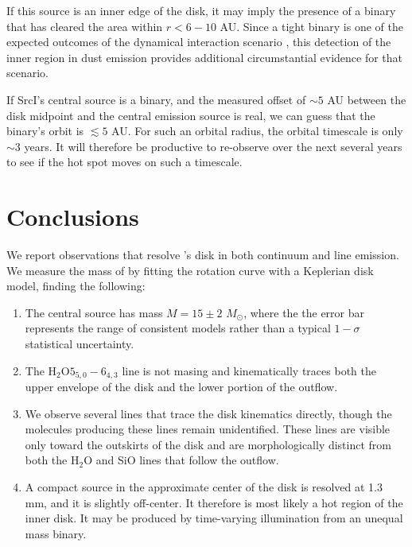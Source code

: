 \documentclass[twocolumn]{aastex61}
\newcommand{\msun}{\ensuremath{M_{\odot}}\xspace}			%
\newcommand{\water}{H$_{2}$O\xspace}		%
\begin{document}
If this source is an inner edge of the disk, it may imply the presence of a
binary that has cleared the area within $r<6-10$ AU.  Since a tight binary is
one of the expected outcomes of the dynamical interaction scenario
\citep{Goddi2011b}, this
detection of the inner region in dust emission provides additional
circumstantial evidence for that scenario.

If SrcI's central source is a binary, and the measured offset of $\sim5$ AU
between the disk midpoint and the central emission source is real, we can guess
that the binary's orbit is $\lesssim5$ AU.  For such an orbital radius, the
orbital timescale is only $\sim3$ years.   It will therefore be productive to
re-observe \sourcei over the next several years to see if the hot spot moves on
such a timescale.

\section{Conclusions}
\label{sec:conclusions}
We report observations that resolve \sourcei's disk in both continuum
and line emission.  We measure the mass of \sourcei by fitting the 
rotation curve with a Keplerian disk model, finding the following:

\begin{enumerate}
    \item The central source has mass $M=15\pm2$ \msun, where the the error
        bar represents the range of consistent models rather than a typical
        $1-\sigma$ statistical uncertainty. 
    \item The \water $5_{5,0}-6_{4,3}$ line is not masing and kinematically
        traces both the upper envelope of the disk and the lower portion of the
        outflow. \\
    \item We observe several lines that trace the disk kinematics
        directly, though the molecules producing these lines remain
        unidentified.  These lines are visible only toward the outskirts of the
        disk and are morphologically distinct from both the \water and SiO
        lines that follow the outflow. 
    \item A compact source in the approximate center of the disk
        is resolved at 1.3 mm, and it is slightly off-center.  It therefore is
        most likely a hot region of the inner disk.  It may be produced
        by time-varying illumination from an unequal mass binary.
\end{enumerate}
\end{document}
